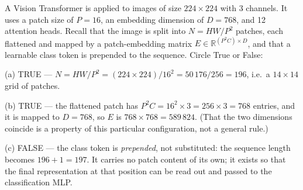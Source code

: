 \documentclass[11pt]{exam}
\newcommand{\TFT}{\ifprintanswers\textbf{TRUE}\hspace{1.1em}False\else True\hspace{1.1em}False\fi}
\newcommand{\TFF}{True\hspace{1.1em}\ifprintanswers\textbf{FALSE}\else False\fi}
\begin{document}
\begin{questions}
\question
A Vision Transformer is applied to images of size $224 \times 224$ with 3 channels. It uses a patch
size of $P = 16$, an embedding dimension of $D = 768$, and 12 attention heads. Recall that the image
is split into $N = HW/P^2$ patches, each flattened and mapped by a patch-embedding matrix
$E \in \mathbb{R}^{(P^2 C) \times D}$, and that a learnable class token is prepended to the sequence.
Circle True or False:


\begin{solution}
  (a) TRUE --- $N = HW/P^2 = (224 \times 224)/16^2 = 50\,176/256 = 196$, i.e.\ a $14 \times 14$ grid
  of patches.

  (b) TRUE --- the flattened patch has $P^2 C = 16^2 \times 3 = 256 \times 3 = 768$ entries, and it
  is mapped to $D = 768$, so $E$ is $768 \times 768 = 589\,824$. (That the two dimensions coincide is
  a property of this particular configuration, not a general rule.)

  (c) FALSE --- the class token is \emph{prepended}, not substituted: the sequence length becomes
  $196 + 1 = 197$. It carries no patch content of its own; it exists so that the final
  representation at that position can be read out and passed to the classification MLP.


\end{solution}
\end{questions}
\end{document}
